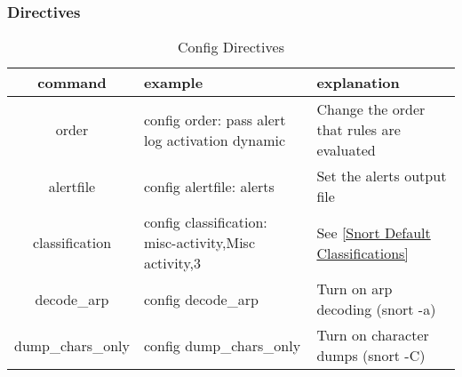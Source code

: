 \documentclass[english]{report}
\begin{document}
\subsubsection{Directives}
\begin{center}
\begin{longtable}{|c|p{2.5in}|p{1.5in}|}
\caption{Config Directives} \\
\hline
command & example & explanation \\
\hline
\hline
order & config order: pass alert log activation dynamic & Change the order that rules are evaluated \\
\hline
alertfile & config alertfile: alerts & Set the alerts output file \\
\hline
classification & config classification: misc-activity,Misc activity,3 & See \ref{Snort Default Classifications} \\
\hline
decode\_arp & config decode\_arp & Turn on arp decoding (snort -a)  \\
\hline
dump\_chars\_only & config dump\_chars\_only & Turn on character dumps (snort -C) \\


\end{longtable}
\end{center}
\end{document}
